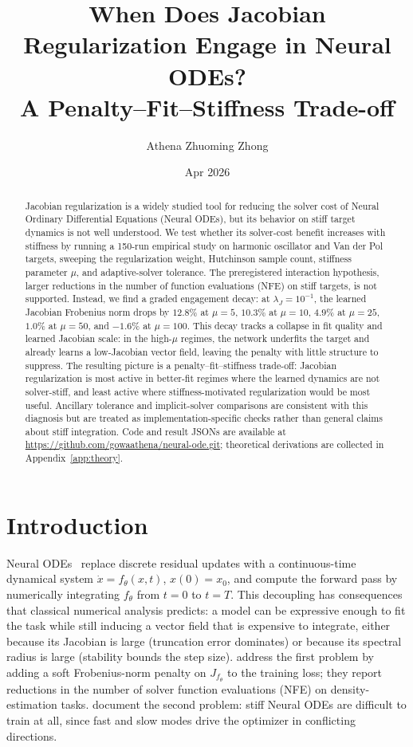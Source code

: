 \documentclass[11pt]{article}
\title{When Does Jacobian Regularization Engage in Neural ODEs? \\
  A Penalty--Fit--Stiffness Trade-off}
\author[1]{Athena Zhuoming Zhong}
\affil[1]{University of Pennsylvania, ENM 5220 Numerical Methods for PDEs}
\date{Apr 2026}
\theoremstyle{plain}
\theoremstyle{definition}
\newcommand{\fjac}{J_{f_\theta}}
\begin{document}
\maketitle

\begin{abstract}
Jacobian regularization is a widely studied tool for reducing the solver cost
of Neural Ordinary Differential Equations (Neural ODEs), but its behavior on
stiff target dynamics is not well understood. We test whether its solver-cost
benefit increases with stiffness by running a 150-run empirical study on
harmonic oscillator and Van der Pol targets, sweeping the regularization
weight, Hutchinson sample count, stiffness parameter $\mu$, and adaptive-solver
tolerance. The preregistered interaction hypothesis, larger reductions in
the number of function evaluations (NFE) on stiff targets, is not
supported. Instead, we find a graded engagement decay: at
$\lambda_J = 10^{-1}$, the learned Jacobian Frobenius norm drops by $12.8\%$
at $\mu = 5$, $10.3\%$ at $\mu = 10$, $4.9\%$ at $\mu = 25$, $1.0\%$ at
$\mu = 50$, and $-1.6\%$ at $\mu = 100$. This decay tracks a collapse in fit
quality and learned Jacobian scale: in the high-$\mu$ regimes, the network
underfits the target and already learns a low-Jacobian vector field, leaving
the penalty with little structure to suppress. The resulting picture is a
penalty--fit--stiffness trade-off: Jacobian regularization is most active in
better-fit regimes where the learned dynamics are not solver-stiff, and least
active where stiffness-motivated regularization would be most useful.
Ancillary tolerance and implicit-solver comparisons are consistent with this
diagnosis but are treated as implementation-specific checks rather than
general claims about stiff integration. Code and result JSONs are available at
\url{https://github.com/gowaathena/neural-ode.git}; theoretical derivations
are collected in Appendix~\ref{app:theory}.
\end{abstract}

\section{Introduction}
\label{sec:intro}

Neural ODEs~\citep{chen2018neural} replace discrete residual updates with a
continuous-time dynamical system $\dot x = f_\theta(x, t)$, $x(0) = x_0$, and
compute the forward pass by numerically integrating $f_\theta$ from $t = 0$ to
$t = T$. This decoupling has consequences that classical numerical analysis
predicts: a model can be expressive enough to fit the task while still inducing
a vector field that is expensive to integrate, either because its Jacobian is
large (truncation error dominates) or because its spectral radius is large
(stability bounds the step size). \citet{finlay2020train} address the first
problem by adding a soft Frobenius-norm penalty on $\fjac$ to the training
loss; they report reductions in the number of solver function evaluations
(NFE) on density-estimation tasks. \citet{kim2021stiff} document the second
problem: stiff Neural ODEs are difficult to train at all, since fast and slow
modes drive the optimizer in conflicting directions.
\end{document}
